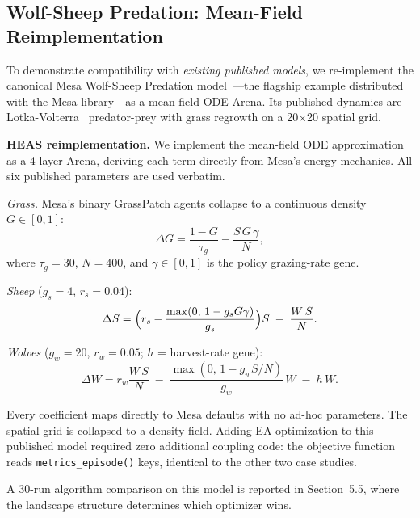 \documentclass{wscpaperproc}
\begin{document}
\subsection{Wolf-Sheep Predation: Mean-Field Reimplementation}
\label{sec:wolfsheep}

To demonstrate compatibility with \emph{existing published models}, we
re-implement the canonical Mesa Wolf-Sheep Predation model~\cite{wilensky1997wolfsheep,kazil2020mesa}---the flagship example distributed with the Mesa library---as a mean-field ODE Arena.
Its published dynamics are Lotka-Volterra~\cite{lotka1925elements,volterra1926variazioni} predator-prey with grass regrowth on a
20$\times$20 spatial grid.

\textbf{HEAS reimplementation.} We implement the mean-field ODE approximation as a
4-layer Arena, deriving each term directly from Mesa's energy mechanics.
All six published parameters are used verbatim.

\textit{Grass.} Mesa's binary GrassPatch agents collapse to a continuous
density $G\in[0,1]$:
\begin{equation}
  \Delta G = \frac{1-G}{\tau_g} - \frac{S\,G\,\gamma}{N},
  \label{eq:grass}
\end{equation}
where $\tau_g\!=\!30$, $N\!=\!400$, and $\gamma\!\in\![0,1]$ is the policy
grazing-rate gene.

\textit{Sheep} ($g_s\!=\!4$, $r_s\!=\!0.04$):
\begin{equation}
  \Delta S = \Bigl(r_s - \frac{\max(0,\,1-g_s G\gamma)}{g_s}\Bigr)S
             \;-\; \frac{W\,S}{N}.
  \label{eq:sheep}
\end{equation}

\textit{Wolves} ($g_w\!=\!20$, $r_w\!=\!0.05$; $h$ = harvest-rate gene):
\begin{equation}
  \Delta W = r_w \frac{W\,S}{N}
             \;-\; \frac{\max(0,\,1-g_w S/N)}{g_w}\,W
             \;-\; h\,W.
  \label{eq:wolf}
\end{equation}

Every coefficient maps directly to Mesa defaults with no ad-hoc parameters. The
spatial grid is collapsed to a density field. Adding EA optimization to this
published model required zero additional coupling code: the objective function
reads \texttt{metrics\_episode()} keys, identical to the other two case studies.

A 30-run algorithm comparison on this model is reported in Section~5.5,
where the landscape structure determines which optimizer wins.
\end{document}
